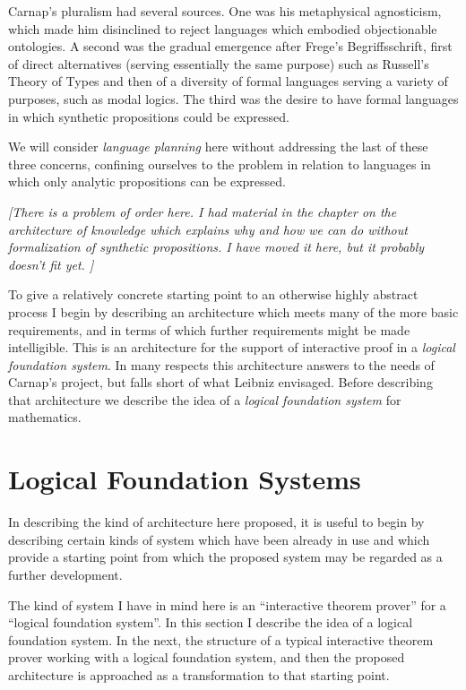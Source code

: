 Carnap's pluralism had several sources.
One was his metaphysical agnosticism, which made him disinclined to
reject languages which embodied objectionable ontologies.
A second was the gradual emergence after Frege's Begriffsschrift,
first of direct alternatives (serving essentially the same purpose)
such as Russell's Theory of Types and then of a diversity of formal
languages serving a variety of purposes, such as modal logics.
The third was the desire to have formal languages in which synthetic
propositions could be expressed.

We will consider \emph{language planning} here without addressing the
last of these three concerns, confining ourselves to the problem in
relation to languages in which only analytic propositions can be
expressed.

{\it
[There is a problem of order here.
I had material in the chapter on the architecture of
knowledge which explains why and how we can do without formalization
of synthetic propositions.
I have moved it here, but it probably doesn't fit yet.
]
}%


To give a relatively concrete starting point to an otherwise highly
abstract process I begin by describing an architecture which meets
many of the more basic requirements, and in terms of which further
requirements might be made intelligible. 
This is an architecture for the support of interactive proof in a
\emph{logical foundation system}. 
In many respects this architecture answers to the needs of Carnap's
project, but falls short of what Leibniz envisaged. 
Before describing that architecture we describe the idea of a
\emph{logical foundation system} for mathematics.

\section{Logical Foundation Systems}

In describing the kind of architecture here proposed, it is useful to
begin by describing certain kinds of system which have been already in
use and which provide a starting point from which the proposed system
may be regarded as a further development.

The kind of system I have in mind here is an ``interactive theorem
prover'' for a ``logical foundation system''.
In this section I describe the idea of a logical foundation system.
In the next, the structure of a typical interactive theorem prover
working with a logical foundation system, and then the proposed
architecture is approached as a transformation to that starting point.

